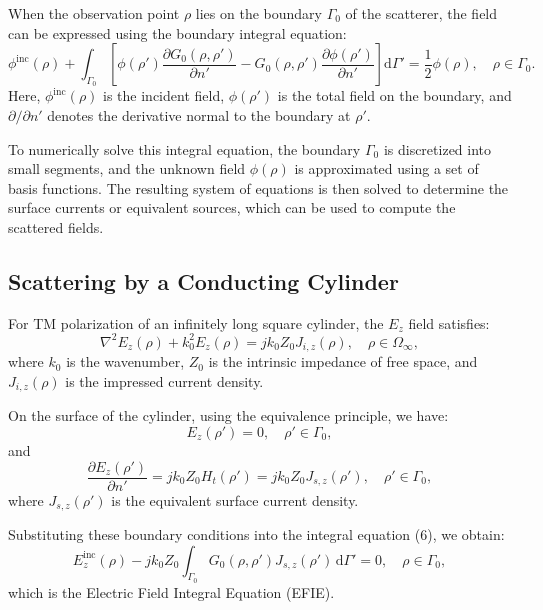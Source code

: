 \documentclass[10pt,a4paper]{article}
\begin{document}
When the observation point $\rho$ lies on the boundary $\Gamma_0$ of the scatterer, the field can be expressed using the boundary integral equation\cite{jin2015theory}:
\begin{equation}
\phi^{\text{inc}}(\rho) + \int_{\Gamma_0} \left[ \phi(\rho') \frac{\partial G_0(\rho, \rho')}{\partial n'} - G_0(\rho, \rho') \frac{\partial \phi(\rho')}{\partial n'} \right] \mathrm{d}\Gamma' = \frac{1}{2} \phi(\rho), \quad \rho \in \Gamma_0.
\end{equation}
Here, $\phi^{\text{inc}}(\rho)$ is the incident field, $\phi(\rho')$ is the total field on the boundary, and $\partial / \partial n'$ denotes the derivative normal to the boundary at $\rho'$.

To numerically solve this integral equation, the boundary $\Gamma_0$ is discretized into small segments, and the unknown field $\phi(\rho)$ is approximated using a set of basis functions. The resulting system of equations is then solved to determine the surface currents or equivalent sources, which can be used to compute the scattered fields.

\subsection{Scattering by a Conducting Cylinder}

For TM polarization of an infinitely long square cylinder, the $E_z$ field satisfies:
\begin{equation}
\nabla^2 E_z(\rho) + k_0^2 E_z(\rho) = jk_0 Z_0 J_{i,z}(\rho), \quad \rho \in \Omega_\infty,
\end{equation}
where $k_0$ is the wavenumber, $Z_0$ is the intrinsic impedance of free space, and $J_{i,z}(\rho)$ is the impressed current density.

On the surface of the cylinder, using the equivalence principle, we have:
\begin{equation}
E_z(\rho') = 0, \quad \rho' \in \Gamma_0,
\end{equation}
and
\begin{equation}
\frac{\partial E_z(\rho')}{\partial n'} = jk_0 Z_0 H_t(\rho') = jk_0 Z_0 J_{s,z}(\rho'), \quad \rho' \in \Gamma_0,
\end{equation}
where $J_{s,z}(\rho')$ is the equivalent surface current density.

Substituting these boundary conditions into the integral equation (6), we obtain:
\begin{equation}
E_z^{\text{inc}}(\rho) - jk_0 Z_0 \int_{\Gamma_0} G_0(\rho, \rho') J_{s,z}(\rho') \, \mathrm{d}\Gamma' = 0, \quad \rho \in \Gamma_0,
\end{equation}
which is the Electric Field Integral Equation (EFIE).
\end{document}
